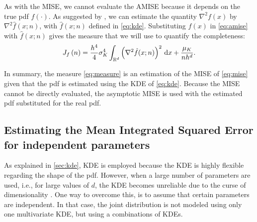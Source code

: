 As with the MISE, we cannot evaluate the AMISE because it depends on the true pdf $f(\cdot)$. As suggested by \textcite{chen2017tutorial, calonico2018effect}, we can estimate the quantity $\nabla^2 f(x)$ by $\nabla^2 \hat{f}(x;n)$, with $\hat{f}(x;n)$ defined in \cref{eq:kde}. 
Substituting $f(x)$ in \cref{eq:amise} with $\hat{f}(x;n)$ gives the measure that we will use to quantify the completeness:
\begin{equation}
	\label{eq:measure}
	J_{f} \left( n \right) = \frac{h^4}{4} \sigma_K^4 \int_{\mathbb{R}^d} \left( \nabla^2 \hat{f}(x;n) \right)^2 \mathrm{\,d} x + \frac{\mu_K}{nh^d}.
\end{equation}

\cstart
In summary, the measure \cref{eq:measure} is an estimation of the MISE of \eqref{eq:mise} given that the pdf is estimated using the KDE of \eqref{eq:kde}. Because the MISE cannot be directly evaluated, the asymptotic MISE is used with the estimated pdf substituted for the real pdf. 
\cend

\subsection{Estimating the Mean Integrated Squared Error for independent parameters}
\label{sec:mise independent}

As explained in \cref{sec:kde}, KDE is employed because the KDE is highly flexible regarding the shape of the pdf. However, when a large number of parameters are used, i.e., for large values of $d$, the KDE becomes unreliable due to the curse of dimensionality \cite{scott2015multivariate}. One way to overcome this, is to assume that certain parameters are independent. 
\cstart
In that case, the joint distribution is not modeled using only one multivariate KDE, but using a combinations of KDEs.
\cend

